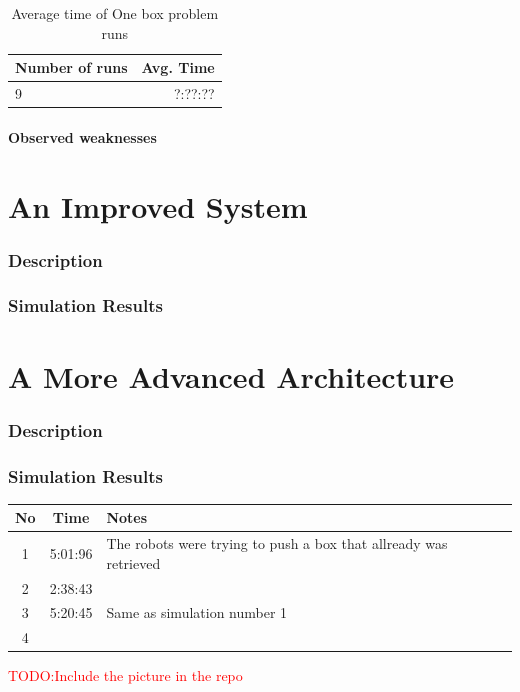 \documentclass[a4paper]{article}
\newcommand\TODO[1]{\textcolor{red}{TODO:#1}}
\newcommand\todo[1]{\TODO{#1}}
\begin{document}
\begin{table}
\centering
\begin{tabular}{ l | r}
\hline Number of runs & Avg. Time \\ \hline
9 & ?:??:?? \\
\end{tabular}
\caption{ Average time of One box problem runs}
\end{table}


\subsection{Observed weaknesses}
\part{An Improved System}

\section{Description}
\section{Simulation Results}
\part{A More Advanced Architecture}

\section{Description}
\newpage
\section{Simulation Results}
\begin{table}[H]
\centering
\begin{tabular}{ c | c | p{5cm}}
\hline No & Time & Notes \\ \hline

1 & 5:01:96 & The robots were trying to push a box that allready was retrieved \\ \hline
2 & 2:38:43 & \\ \hline
3 & 5:20:45 & Same as simulation number 1 \\ \hline
4


\end{tabular}
\end{table}




\newpage
\todo{Include the picture in the repo}



\nocite{*}
\end{document}
